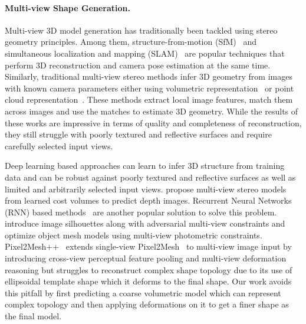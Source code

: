 \paragraph{Multi-view Shape Generation.}\vspace{-4mm}
Multi-view 3D model generation has traditionally been tackled using stereo geometry principles.
Among them, structure-from-motion (SfM)~\cite{schonberger2016structure,agarwal2011building,cui2015global,cui2017hsfm} and simultaneous localization and mapping (SLAM)~\cite{cadena2016pastslam,mur2015orb,engel2014lsd,whelan2015elasticfusion} are popular techniques that perform 3D reconstruction and camera pose estimation at the same time.
Similarly, traditional multi-view stereo methods infer 3D geometry from images with known camera parameters either using
volumetric representation~\cite{kutulakos2000theory, seitz1999photorealistic} or
point cloud representation~\cite{furukawa2009accurate, lhuillier2005quasi}.
These methods extract local image features, match them across images and use the matches to estimate 3D geometry.
While the results of these works are impressive in terms of quality and completeness of reconstruction, they still struggle with poorly textured and reflective surfaces and require carefully selected input views.

Deep learning based approaches can learn to infer 3D structure from training data and can be robust against poorly textured and reflective surfaces as well as limited and arbitrarily selected input views.
\cite{hartmann2017learned_16,deepmvs2018,yao2018mvsnet,chen2019point,luo2019pmvsnet,gu2019cascade,yao2019recurrent} propose multi-view stereo models from learned cost volumes to predict depth images.
Recurrent Neural Networks (RNN) based methods~\cite{3dr2n2, kar2017lsm, mcrecon2017} are another popular solution to solve this problem.
\cite{mcrecon2017, lin2019photometric} introduce image silhouettes along with adversarial multi-view constraints and optimize object mesh models using multi-view photometric constraints.
Pixel2Mesh++~\cite{wen2019pixel2mesh++} extends single-view Pixel2Mesh~\cite{wang2018pixel2mesh} to multi-view image input by introducing cross-view perceptual feature pooling and multi-view deformation reasoning but struggles to reconstruct complex shape topology due to its use of ellipsoidal template shape which it deforms to the final shape.
Our work avoids this pitfall by first predicting a coarse volumetric model which can represent complex topology and then applying deformations on it to get a finer shape as the final model.

